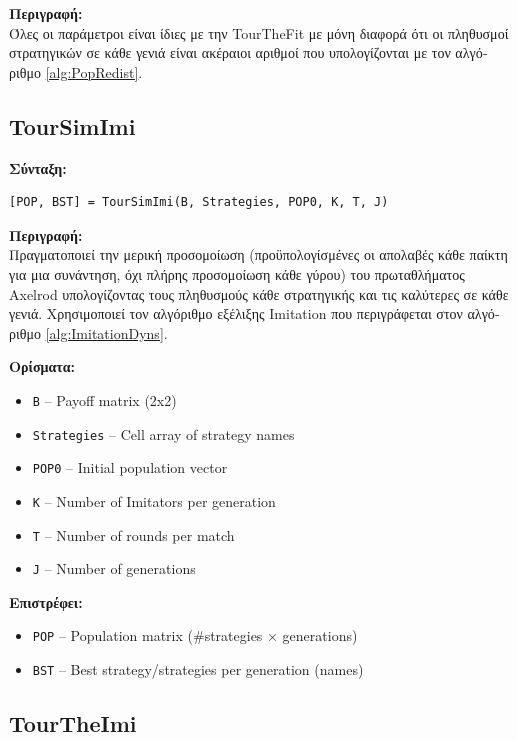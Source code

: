 \documentclass[12pt]{report}
\begin{document}
\textbf{\foreignlanguage{greek}{Περιγραφή:}} \\
\foreignlanguage{greek}{
Όλες οι παράμετροι είναι ίδιες με την \foreignlanguage{english}{TourTheFit} με μόνη διαφορά ότι οι πληθυσμοί στρατηγικών σε κάθε γενιά είναι ακέραιοι αριθμοί που υπολογίζονται με τον αλγόριθμο \ref{alg:PopRedist}.}

\subsection*{TourSimImi}

\textbf{\foreignlanguage{greek}{Σύνταξη}:}
\begin{verbatim}
[POP, BST] = TourSimImi(B, Strategies, POP0, K, T, J)
\end{verbatim}

\textbf{\foreignlanguage{greek}{Περιγραφή:}} \\
\foreignlanguage{greek}{
Πραγματοποιεί την μερική προσομοίωση (προϋπολογίσμένες οι απολαβές κάθε παίκτη για μια συνάντηση, όχι πλήρης προσομοίωση κάθε γύρου) του πρωταθλήματος \foreignlanguage{english}{Axelrod} υπολογίζοντας τους πληθυσμούς κάθε στρατηγικής και τις καλύτερες σε κάθε γενιά. Χρησιμοποιεί τον αλγόριθμο εξέλιξης \foreignlanguage{english}{Imitation} που περιγράφεται στον αλγόριθμο \ref{alg:ImitationDyns}.}

\textbf{\foreignlanguage{greek}{Ορίσματα:}}
\begin{itemize}
    \item \texttt{B} – Payoff matrix (2x2)
    \item \texttt{Strategies} – Cell array of strategy names
    \item \texttt{POP0} – Initial population vector
    \item \texttt{K} – Number of Imitators per generation
    \item \texttt{T} – Number of rounds per match
    \item \texttt{J} – Number of generations
\end{itemize}

\textbf{\foreignlanguage{greek}{Επιστρέφει}:}
\begin{itemize}
    \item \texttt{POP} – Population matrix (\#strategies × generations)
    \item \texttt{BST} – Best strategy/strategies per generation (names)
\end{itemize}

\subsection*{TourTheImi}
\end{document}
